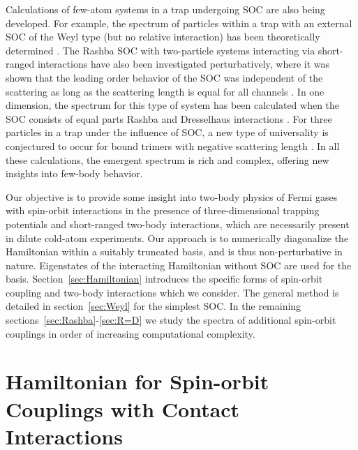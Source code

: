 \documentclass[%
 notitlepage,
 preprint,
showpacs,%
 amsmath,amssymb,
 aps,
pra,
]{revtex4-1}
\begin{document}
Calculations of few-atom systems in a trap undergoing SOC are also being developed.  For example, the spectrum of particles within a trap with an external SOC of the Weyl type (but no relative interaction) has been theoretically determined \cite{anderson2013}. The Rashba SOC with two-particle systems interacting via short-ranged interactions have also been investigated perturbatively, where it was shown that the leading order behavior of the SOC was independent of the scattering as long as the scattering length is equal for all channels \cite{PhysRevA.89.033606}.  In one dimension, the spectrum for this type of system has been calculated when the SOC consists of equal parts Rashba and Dresselhaus interactions \cite{guan2014energy}.  For three particles in a trap under the influence of SOC, a new type of universality is conjectured to occur for bound trimers with negative scattering length \cite{PhysRevLett.112.013201}.  In all these calculations, the emergent spectrum is rich and complex, offering new insights into few-body behavior.

Our objective is to provide some insight into two-body physics of Fermi gases with spin-orbit interactions in the presence of three-dimensional trapping potentials and short-ranged two-body interactions, which are necessarily present in dilute cold-atom experiments. Our approach is to numerically diagonalize the Hamiltonian within a suitably truncated basis, and is thus non-perturbative in nature. Eigenstates of the interacting Hamiltonian without SOC are used for the basis. Section~\ref{sec:Hamiltonian} introduces the specific forms of spin-orbit coupling and two-body interactions which we consider. The general method is detailed in section~\ref{sec:Weyl} for the simplest SOC.  In the remaining sections~\ref{sec:Rashba}-\ref{sec:R=D} we study the spectra of additional spin-orbit couplings in order of increasing computational complexity.

\section{\label{sec:Hamiltonian}Hamiltonian for Spin-orbit Couplings with Contact Interactions}
\end{document}
